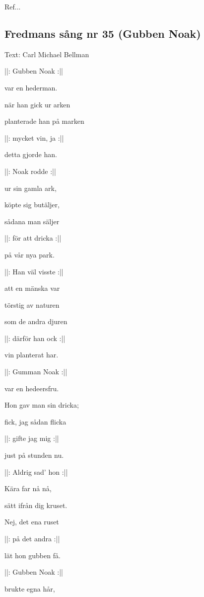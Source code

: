 Ref... \bigskip

\subsection{\textbf{Fredmans sång nr 35 (Gubben Noak)}}

Text: Carl Michael Bellman\bigskip

||: Gubben Noak :||

var en hederman.

när han gick ur arken

planterade han på marken

||: mycket vin, ja :||

detta gjorde han.\bigskip



||: Noak rodde :||

ur sin gamla ark,

köpte sig butäljer,

sådana man säljer

||: för att dricka :||

på vår nya park.\bigskip



||: Han väl visste :||

att en mänska var

törstig av naturen

som de andra djuren

||: därför han ock :||

vin planterat har.\bigskip



||: Gumman Noak :||

var en hedeersfru.

Hon gav man sin dricka;

fick, jag sådan flicka

||: gifte jag mig :||

just på stunden nu.\bigskip



||: Aldrig sad’ hon :||

Kära far nå nå,

sätt ifrån dig kruset.

Nej, det ena ruset

||: på det andra :||

lät hon gubben få.\bigskip



||: Gubben Noak :||

brukte egna hår,

